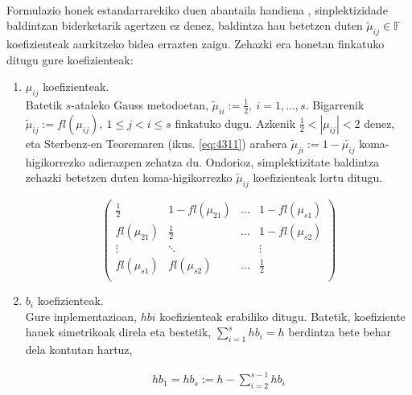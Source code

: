 \paragraph*{} Formulazio honek  estandarrarekiko duen abantaila handiena , sinplektizidade baldintzan biderketarik agertzen ez denez,  baldintza hau betetzen duten $\tilde \mu_{ij} \in \mathbb{F}$ koefizienteak aurkitzeko bidea errazten zaigu. Zehazki era honetan finkatuko ditugu gure koefizienteak:

\begin{enumerate}
\item $\mu_{ij}$ koefizienteak.\\

Batetik $s$-ataleko Gauss metodoetan, $\tilde \mu_{ii}:=\frac{1}{2}, \ i=1,\dots,s$. Bigarrenik $\tilde \mu_{ij}:=fl(\mu_{ij}), \ 1 \le j < i \le s$ finkatuko dugu. Azkenik $\frac{1}{2} < |\mu_{ij}| <2$ denez, eta Sterbenz-en Teoremaren (ikus. \ref{eq:4311}) arabera  $\tilde \mu_{ji}:=1-\tilde{\mu_{ij}}$ koma-higikorrezko adierazpen zehatza du. Ondorioz, simplektizitate baldintza zehazki betetzen duten koma-higikorrezko $\tilde \mu_{ij}$ koefizienteak lortu ditugu.   

\begin{equation}
\left(\begin{array}{cccc}
    \frac{1}{2}       & 1-fl(\mu_{21}) & \dots & 1-fl(\mu_{s1})      \\
    fl(\mu_{21})      & \frac{1}{2}    & \dots & 1-fl(\mu_{s2})      \\
    \vdots            & \ddots         &       & \vdots              \\
    fl(\mu_{s1})      & fl(\mu_{s2})   & \dots & \frac{1}{2}          \\ 
     \end{array}\right)
\end{equation}

\item $b_{i}$ koefizienteak.\\

Gure inplementazioan, $hbi$ koefizienteak erabiliko ditugu. Batetik, koefiziente hauek simetrikoak direla eta bestetik, $\sum\limits_{i=1}^{s} hb_i=h$ berdintza bete behar dela kontutan hartuz,

\begin{eqnarray}
hb_1=hb_s:= h - \sum\limits_{i=2}^{s-1} hb_i
\end{eqnarray}


\end{enumerate}

